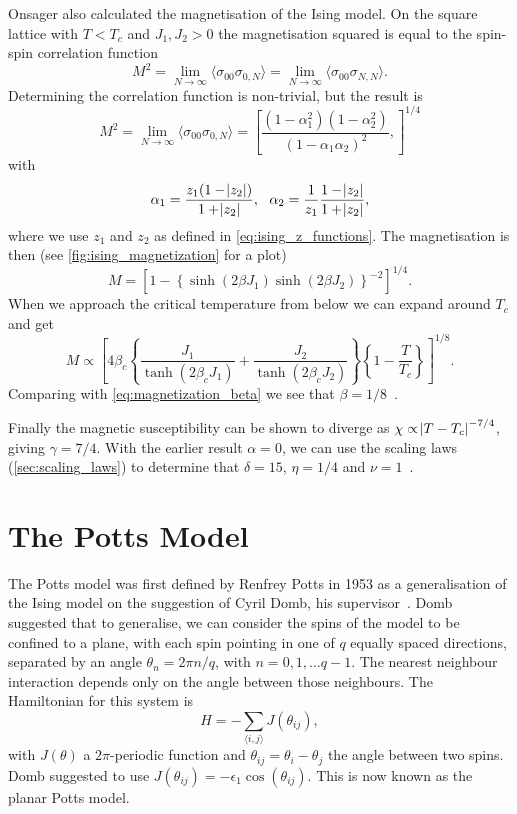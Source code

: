 \documentclass[11pt, a4paper]{report} %
\begin{document}
Onsager also calculated the magnetisation of the Ising model.
On the square lattice with \(T < T_c\) and \(J_1, J_2 > 0\) the magnetisation squared is equal to the spin-spin correlation function
\begin{equation}
	M^2 = \lim_{N \to \infty} \langle \sigma_{00} \sigma_{0,N} \rangle = \lim_{N \to \infty} \langle \sigma_{00} \sigma_{N, N} \rangle.
\end{equation}
Determining the correlation function is non-trivial, but the result is
\begin{equation}
	M^2 = \lim_{N \to \infty} \langle \sigma_{00} \sigma_{0,N} \rangle = \left[ \frac{(1-\alpha_1^2)(1-\alpha_2^2)}{(1-\alpha_1 \alpha_2)^2}, \right]^{1/4}
\end{equation}
with
\begin{equation}
	\alpha_1 = \frac{z_1(1-\abs{z_2})}{1+\abs{z_2}},\ \ \alpha_2 = \frac{1}{z_1}\frac{1-\abs{z_2}}{1+\abs{z_2}},
\end{equation}
where we use \(z_1\) and \(z_2\) as defined in \cref{eq:ising_z_functions}.
The magnetisation is then (see \cref{fig:ising_magnetization} for a plot)
\begin{equation}
	M = \left[1 - \left\{\sinh(2\beta J_1)\sinh(2 \beta J_2)\right\}^{-2} \right]^{1/4}.
\end{equation}
When we approach the critical temperature from below we can expand around \(T_c\) and get
\begin{equation}
	M \propto \left[4\beta_c\left\{\frac{J_1}{\tanh(2\beta_c J_1)} + \frac{J_2}{\tanh(2\beta_c J_2)}\right\} \left\{1-\frac{T}{T_c}\right\}\right]^{1/8}.
\end{equation}
Comparing with \cref{eq:magnetization_beta} we see that \(\beta = 1/8\)~\cite{wu:1982}.

Finally the magnetic susceptibility can be shown to diverge as \(\chi \propto \abs{T - T_c}^{-7/4}\), giving \(\gamma = 7/4\).
With the earlier result \(\alpha=0\), we can use the scaling laws (\cref{sec:scaling_laws}) to determine that \(\delta = 15\), \(\eta = 1/4\) and \(\nu = 1\)~\cite{binney:1992}.

\section{The Potts Model}
The Potts model was first defined by Renfrey Potts in 1953 as a generalisation of the Ising model on the suggestion of Cyril Domb, his supervisor~\cite{potts:1952}.
Domb suggested that to generalise, we can consider the spins of the model to be confined to a plane, with each spin pointing in one of \(q\) equally spaced directions, separated by an angle \(\theta_n = 2\pi n /q\), with \(n = 0, 1, \ldots q - 1\).
The nearest neighbour interaction depends only on the angle between those neighbours.
The Hamiltonian for this system is
\begin{equation}
	H = - \sum_{\langle i, j \rangle} J(\theta_{ij}),
\end{equation}
with \(J(\theta)\) a \(2\pi\)-periodic function and \(\theta_{ij} = \theta_i - \theta_j\) the angle between two spins.
Domb suggested to use \(J(\theta_{ij}) = - \epsilon_1\cos(\theta_{ij})\).
This is now known as the planar Potts model.\cite{wu:1982}
\end{document}
